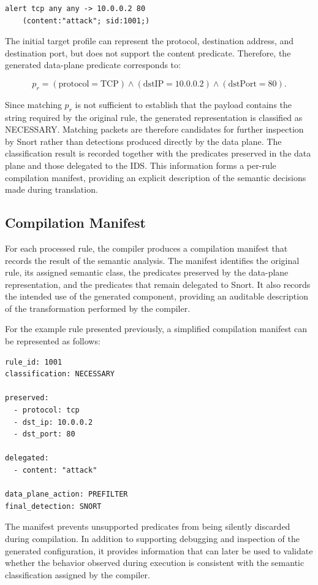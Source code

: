 \documentclass{article}
\begin{document}
\begin{verbatim}
alert tcp any any -> 10.0.0.2 80
    (content:"attack"; sid:1001;)
\end{verbatim}

The initial target profile can represent the protocol, destination
address, and destination port, but does not support the content
predicate. Therefore, the generated data-plane predicate corresponds
to:

\[
p_r =
(\mathrm{protocol}=\mathrm{TCP})
\land
(\mathrm{dstIP}=10.0.0.2)
\land
(\mathrm{dstPort}=80).
\]

Since matching $p_r$ is not sufficient to establish that the payload
contains the string required by the original rule, the generated
representation is classified as NECESSARY. Matching packets are
therefore candidates for further inspection by Snort rather than
detections produced directly by the data plane.
The classification result is recorded together with the predicates
preserved in the data plane and those delegated to the IDS. This
information forms a per-rule compilation manifest, providing an
explicit description of the semantic decisions made during
translation.
\subsection{Compilation Manifest}
For each processed rule, the compiler produces a compilation manifest
that records the result of the semantic analysis. The manifest identifies
the original rule, its assigned semantic class, the predicates preserved
by the data-plane representation, and the predicates that remain
delegated to Snort. It also records the intended use of the generated
component, providing an auditable description of the transformation
performed by the compiler.

For the example rule presented previously, a simplified compilation
manifest can be represented as follows:

\begin{verbatim}
rule_id: 1001
classification: NECESSARY

preserved:
  - protocol: tcp
  - dst_ip: 10.0.0.2
  - dst_port: 80

delegated:
  - content: "attack"

data_plane_action: PREFILTER
final_detection: SNORT
\end{verbatim}

The manifest prevents unsupported predicates from being silently
discarded during compilation. In addition to supporting debugging and
inspection of the generated configuration, it provides information that
can later be used to validate whether the behavior observed during
execution is consistent with the semantic classification assigned by
the compiler.
\end{document}

